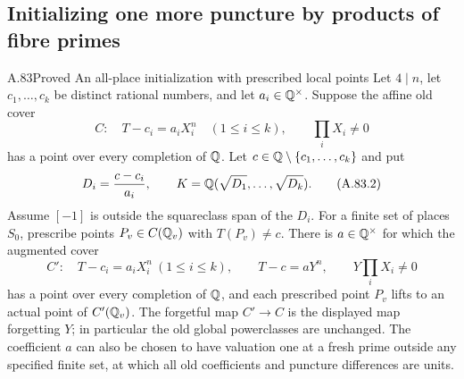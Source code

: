 \subsection{Initializing one more puncture by products of fibre primes}

\begin{statement}{A.83}{Proved}
{An all-place initialization with prescribed local points}
Let $4\mid n$, let $c_1,\ldots,c_k$ be distinct rational numbers,
and let $a_i\in\mathbb Q^\times$.  Suppose the affine old cover
\[
 C:\quad T-c_i=a_iX_i^n\quad(1\le i\le k),
                         \qquad\prod_iX_i\ne0
 \tag{A.83.1}
\]
has a point over every completion of $\mathbb Q$.
Let $c\in\mathbb Q\setminus\{c_1,\ldots,c_k\}$ and put
\[
 D_i=\frac{c-c_i}{a_i},\qquad
 K=\mathbb Q(\sqrt{D_1},\ldots,\sqrt{D_k}).
 \tag{A.83.2}
\]
Assume $[-1]$ is outside the squareclass span of the $D_i$.
For a finite set of places $S_0$, prescribe points
$P_v\in C(\mathbb Q_v)$ with $T(P_v)\ne c$.
There is $a\in\mathbb Q^\times$ for which the augmented cover
\[
 C':\quad T-c_i=a_iX_i^n\ (1\le i\le k),
       \qquad T-c=aY^n,\qquad Y\prod_iX_i\ne0
 \tag{A.83.3}
\]
has a point over every completion of $\mathbb Q$, and each prescribed
point $P_v$ lifts to an actual point of $C'(\mathbb Q_v)$.
The forgetful map $C'\to C$ is the displayed map forgetting $Y$;
in particular the old global powerclasses are unchanged.
The coefficient $a$ can also be chosen to have valuation one
at a fresh prime outside any specified finite set, at which
all old coefficients and puncture differences are units.
\end{statement}
